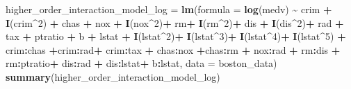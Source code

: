 \documentclass[
]{article}
\newenvironment{Shaded}{\begin{snugshade}}{\end{snugshade}}
\newcommand{\AttributeTok}[1]{\textcolor[rgb]{0.13,0.29,0.53}{#1}}
\newcommand{\DecValTok}[1]{\textcolor[rgb]{0.00,0.00,0.81}{#1}}
\newcommand{\FunctionTok}[1]{\textcolor[rgb]{0.13,0.29,0.53}{\textbf{#1}}}
\newcommand{\NormalTok}[1]{#1}
\newcommand{\OtherTok}[1]{\textcolor[rgb]{0.56,0.35,0.01}{#1}}
\newcommand{\SpecialCharTok}[1]{\textcolor[rgb]{0.81,0.36,0.00}{\textbf{#1}}}
\begin{document}
\begin{Shaded}
\begin{Highlighting}[]
\NormalTok{higher\_order\_interaction\_model\_log }\OtherTok{=} \FunctionTok{lm}\NormalTok{(}\AttributeTok{formula =} \FunctionTok{log}\NormalTok{(medv) }\SpecialCharTok{\textasciitilde{}}\NormalTok{ crim }\SpecialCharTok{+} \FunctionTok{I}\NormalTok{(crim}\SpecialCharTok{\^{}}\DecValTok{2}\NormalTok{) }\SpecialCharTok{+}\NormalTok{ chas }\SpecialCharTok{+}\NormalTok{ nox }\SpecialCharTok{+} \FunctionTok{I}\NormalTok{(nox}\SpecialCharTok{\^{}}\DecValTok{2}\NormalTok{)}\SpecialCharTok{+}\NormalTok{ rm}\SpecialCharTok{+} \FunctionTok{I}\NormalTok{(rm}\SpecialCharTok{\^{}}\DecValTok{2}\NormalTok{)}\SpecialCharTok{+}\NormalTok{ dis }\SpecialCharTok{+} \FunctionTok{I}\NormalTok{(dis}\SpecialCharTok{\^{}}\DecValTok{2}\NormalTok{)}\SpecialCharTok{+}\NormalTok{ rad }\SpecialCharTok{+}\NormalTok{ tax }\SpecialCharTok{+}\NormalTok{ ptratio }\SpecialCharTok{+}\NormalTok{ b }\SpecialCharTok{+}\NormalTok{ lstat }\SpecialCharTok{+} \FunctionTok{I}\NormalTok{(lstat}\SpecialCharTok{\^{}}\DecValTok{2}\NormalTok{)}\SpecialCharTok{+} \FunctionTok{I}\NormalTok{(lstat}\SpecialCharTok{\^{}}\DecValTok{3}\NormalTok{)}\SpecialCharTok{+} \FunctionTok{I}\NormalTok{(lstat}\SpecialCharTok{\^{}}\DecValTok{4}\NormalTok{)}\SpecialCharTok{+} \FunctionTok{I}\NormalTok{(lstat}\SpecialCharTok{\^{}}\DecValTok{5}\NormalTok{) }\SpecialCharTok{+}\NormalTok{ crim}\SpecialCharTok{:}\NormalTok{chas  }\SpecialCharTok{+}\NormalTok{crim}\SpecialCharTok{:}\NormalTok{rad}\SpecialCharTok{+}\NormalTok{ crim}\SpecialCharTok{:}\NormalTok{tax }\SpecialCharTok{+}\NormalTok{ chas}\SpecialCharTok{:}\NormalTok{nox }\SpecialCharTok{+}\NormalTok{chas}\SpecialCharTok{:}\NormalTok{rm }\SpecialCharTok{+}\NormalTok{ nox}\SpecialCharTok{:}\NormalTok{rad }\SpecialCharTok{+}\NormalTok{ rm}\SpecialCharTok{:}\NormalTok{dis }\SpecialCharTok{+}\NormalTok{ rm}\SpecialCharTok{:}\NormalTok{ptratio}\SpecialCharTok{+}\NormalTok{ dis}\SpecialCharTok{:}\NormalTok{rad }\SpecialCharTok{+}\NormalTok{ dis}\SpecialCharTok{:}\NormalTok{lstat}\SpecialCharTok{+}\NormalTok{ b}\SpecialCharTok{:}\NormalTok{lstat, }\AttributeTok{data =}\NormalTok{ boston\_data)}
\FunctionTok{summary}\NormalTok{(higher\_order\_interaction\_model\_log)}
\end{Highlighting}
\end{Shaded}
\end{document}
